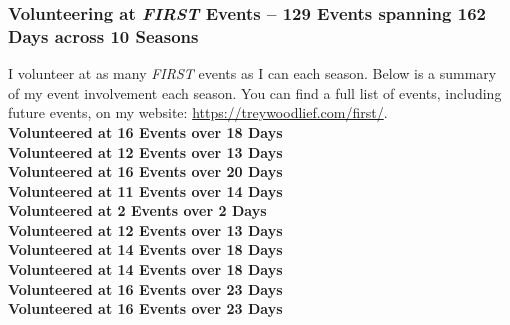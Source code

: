 \subsubsection*{Volunteering at \textit{FIRST} Events -- 129 Events spanning 162 Days across 10 Seasons}
I volunteer at as many \textit{FIRST} events as I can each season. Below is a summary of my event involvement each season.
You can find a full list of events, including future events, on my website: \url{https://treywoodlief.com/first/}.\\ 
 \textbf{Volunteered at 16 Events over 18 Days}\\ 
 \textbf{Volunteered at 12 Events over 13 Days}\\ 
 \textbf{Volunteered at 16 Events over 20 Days}\\ 
 \textbf{Volunteered at 11 Events over 14 Days}\\ 
 \textbf{Volunteered at 2 Events over 2 Days}\\ 
 \textbf{Volunteered at 12 Events over 13 Days}\\ 
 \textbf{Volunteered at 14 Events over 18 Days}\\ 
 \textbf{Volunteered at 14 Events over 18 Days}\\ 
 \textbf{Volunteered at 16 Events over 23 Days}\\ 
 \textbf{Volunteered at 16 Events over 23 Days}\\ 
